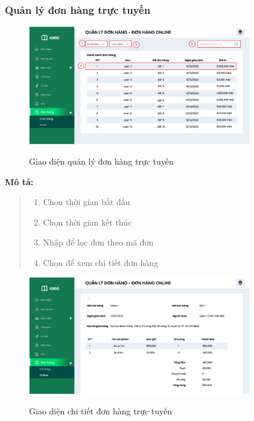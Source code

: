     \subsubsection{Quản lý đơn hàng trực tuyến}
    \begin{figure}[!htp]
        \centering
        \includegraphics[width=3.8in]{img/UI/admin/OnlineOrder.png}
        \label{40}
        \newline
        \caption{Giao diện quản lý đơn hàng trực tuyến}
    \end{figure}
    \textbf{Mô tả:}  
    \begin{quote}
        \begin{enumerate}
            \item Chọn thời gian bắt đầu
            \item Chọn thời gian kết thúc
            \item Nhập để lọc đơn theo mã đơn
            \item Chọn để xem chi tiết đơn hàng
        \end{enumerate}
    \end{quote}
    
        \begin{figure}[!htp]
            \centering
            \includegraphics[width=3.8in]{img/UI/admin/OnlineOrder_detail.png}
            \label{41}
            \newline
            \caption{Giao diện chi tiết đơn hàng trực tuyến}
        \end{figure}
    
